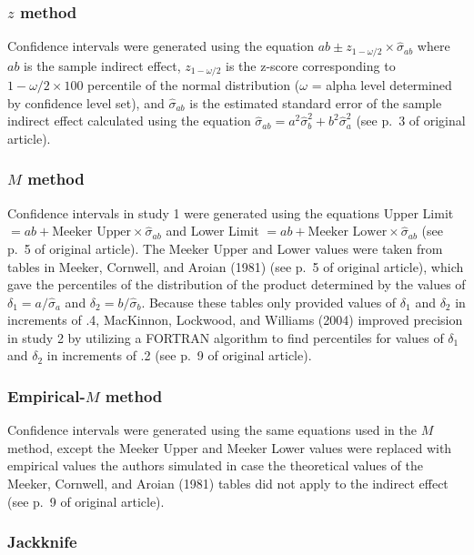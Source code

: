 \documentclass[10,a4paperpaper,]{article}
\begin{document}
\subsubsection{$z$ method}

Confidence intervals were generated using the equation
\(ab \pm z_{1- \omega/2} \times \hat{\sigma}_{ab}\) where \(ab\) is the
sample indirect effect, \(z_{1- \omega/2}\) is the z-score corresponding
to \(1- \omega/2 \times 100\) percentile of the normal distribution
(\(\omega\) = alpha level determined by confidence level set), and
\(\hat{\sigma}_{ab}\) is the estimated standard error of the sample
indirect effect calculated using the equation
\(\hat{\sigma}_{ab} = a^2 \hat{\sigma}^2_b + b^2 \hat{\sigma}^2_a\) (see
p.~3 of original article).

\subsubsection{$M$ method}

Confidence intervals in study 1 were generated using the equations Upper
Limit \(=ab+\text{Meeker Upper} \times \hat{\sigma}_{ab}\) and Lower
Limit \(=ab+\text{Meeker Lower} \times \hat{\sigma}_{ab}\) (see p.~5 of
original article). The Meeker Upper and Lower values were taken from
tables in Meeker, Cornwell, and Aroian (1981) (see p.~5 of original
article), which gave the percentiles of the distribution of the product
determined by the values of \(\delta_1 = a/\hat{\sigma}_a\) and
\(\delta_2 = b/\hat{\sigma}_b\). Because these tables only provided
values of \(\delta_1\) and \(\delta_2\) in increments of .4, MacKinnon,
Lockwood, and Williams (2004) improved precision in study 2 by utilizing
a FORTRAN algorithm to find percentiles for values of \(\delta_1\) and
\(\delta_2\) in increments of .2 (see p.~9 of original article).

\subsubsection{Empirical-$M$ method}

Confidence intervals were generated using the same equations used in the
\(M\) method, except the Meeker Upper and Meeker Lower values were
replaced with empirical values the authors simulated in case the
theoretical values of the Meeker, Cornwell, and Aroian (1981) tables did
not apply to the indirect effect (see p.~9 of original article).

\subsubsection{Jackknife}
\end{document}
